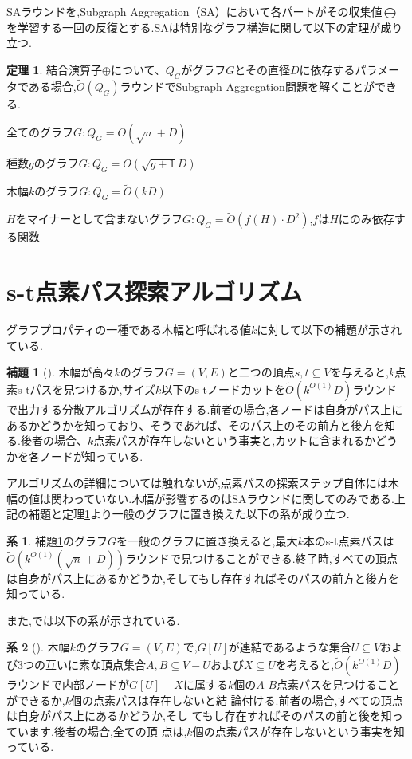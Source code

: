 \documentclass{thesis}
\theoremstyle{definition}
\newtheorem{theorem}{定理}
\newtheorem{lemma}{補題}
\newtheorem{corollary}{系}
\begin{document}
SAラウンドを,Subgraph Aggregation（SA）において各パートがその収集値$\bigoplus$を学習する一回の反復とする.SAは特別なグラフ構造に関して以下の定理が成り立つ.

\begin{theorem} \label{SA}
    結合演算子$\oplus$について、$Q_G$がグラフ$G$とその直径$D$に依存するパラメータである場合,$\tilde{O}(Q_G)$ラウンドでSubgraph Aggregation問題を解くことができる.
    \item 全てのグラフ$G:Q_G = O(\sqrt{n}+D)$
    \item 種数$g$のグラフ$G:Q_G=O(\sqrt{g+1}D)$
    \item 木幅$k$のグラフ$G:Q_G=\tilde{O}(kD)$
    \item $H$をマイナーとして含まないグラフ$G:Q_G=\tilde{O}(f(H)\cdot D^2)$,$f$は$H$にのみ依存する関数
\end{theorem}


\section{s-t点素パス探索アルゴリズム}
グラフプロパティの一種である木幅と呼ばれる値$k$に対して以下の補題が示されている.

\begin{lemma}[\cite{li2018distributed}] \label{path}
    木幅が高々$k$のグラフ$G=(V,E)$と二つの頂点$s,t\subseteq V$を与えると,$k$点素s-tパスを見つけるか,サイズ$k$以下のs-tノードカットを$\tilde{O}(k^{O(1)}D)$ラウンドで出力する分散アルゴリズムが存在する.前者の場合,各ノードは自身がパス上にあるかどうかを知っており、そうであれば、そのパス上のその前方と後方を知る.後者の場合、$k$点素パスが存在しないという事実と,カットに含まれるかどうかを各ノードが知っている.
\end{lemma}

 アルゴリズムの詳細については触れないが,点素パスの探索ステップ自体には木幅の値は関わっていない.木幅が影響するのはSAラウンドに関してのみである.上記の補題と定理\ref{SA}より一般のグラフに置き換えた以下の系が成り立つ.

\begin{corollary}
    補題\ref{path}のグラフ$G$を一般のグラフに置き換えると,最大$k$本のs-t点素パスは$\tilde{O}(k^{O(1)}(\sqrt{n}+D))$ラウンドで見つけることができる.終了時,すべての頂点は自身がパス上にあるかどうか,そしてもし存在すればそのパスの前方と後方を知っている.
\end{corollary}

また,\cite{li2018distributed}では以下の系が示されている.

\begin{corollary}[\cite{li2018distributed}] \label{A-Bpath}
    木幅$k$のグラフ$G =(V,E)$で,$G[U]$が連結であるような集合$U \subseteq V$およ
    び3つの互いに素な頂点集合$A,B \subseteq V - U$および$X \subseteq U$を考えると,$\tilde{O}(k^{O(1)}D)$ラウンドで内部ノードが$G[U] - X$に属する$k$個の$A$-$B$点素パスを見つけることができるか,$k$個の点素パスは存在しないと結
    論付ける.前者の場合,すべての頂点は自身がパス上にあるかどうか,そし
    てもし存在すればそのパスの前と後を知っています.後者の場合,全ての頂
    点は,$k$個の点素パスが存在しないという事実を知っている.
\end{corollary}
\end{document}

